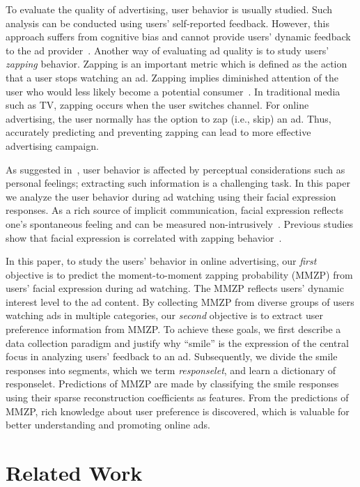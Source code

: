 \documentclass[twoside,leqno,twocolumn]{article}
\begin{document}
To evaluate the quality of advertising, user behavior is usually studied. Such analysis can be conducted using users' self-reported feedback. However, this approach suffers from cognitive bias and cannot provide users' dynamic feedback to the ad provider~\cite{Poels06}. Another way of evaluating ad quality is to study users' \textit{zapping} behavior. Zapping is an important metric which is defined as the action that a user stops watching an ad. Zapping implies diminished attention of the user who would less likely become a potential consumer~\cite{Elpers03}. In traditional media such as TV, zapping occurs when the user switches channel. For online advertising, the user normally has the option to zap (i.e., skip) an ad. Thus, accurately predicting and preventing zapping can lead to more effective advertising campaign. 

As suggested in~\cite{Abbasi_15}, user behavior is affected by perceptual considerations such as personal feelings; extracting such information is a challenging task. In this paper we analyze the user behavior during ad watching using their facial expression responses. As a rich source of implicit communication, facial expression reflects one's spontaneous feeling and can be measured non-intrusively~\cite{Ekman93}. Previous studies show that facial expression is correlated with zapping behavior~\cite{Yang_TAC14, Yang_FG15}.  

In this paper, to study the users' behavior in online advertising, our \textit{first} objective is to predict the moment-to-moment zapping probability (MMZP) from users' facial expression during ad watching. The MMZP reflects users' dynamic interest level to the ad content. By collecting MMZP from diverse groups of users watching ads in multiple categories, our \textit{second} objective is to extract user preference information from MMZP. To achieve these goals, we first describe a data collection paradigm and justify why ``smile'' is the expression of the central focus in analyzing users' feedback to an ad. Subsequently, we divide the smile responses into segments, which we term \textit{responselet}, and learn a dictionary of responselet. Predictions of MMZP are made by classifying the smile responses using their sparse reconstruction coefficients as features. From the predictions of MMZP, rich knowledge about user preference is discovered, which is valuable for better understanding and promoting online ads. 


\section{Related Work}
\end{document}

